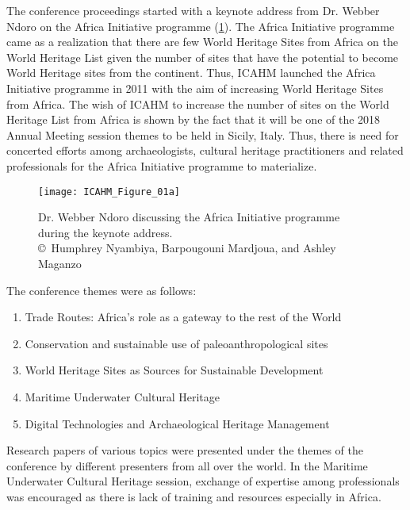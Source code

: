 The conference proceedings started with a keynote address from Dr. Webber Ndoro on the Africa Initiative programme (\cref{fig:ICAHM_Figure_01a}).  The Africa Initiative programme came as a realization that there are few World Heritage Sites from Africa on the World Heritage List given the number of sites that have the potential to become World Heritage sites from the continent. Thus, ICAHM launched the Africa Initiative programme in 2011 with the aim of increasing World Heritage Sites from Africa. The wish of ICAHM to increase the number of sites on the World Heritage List from Africa is shown by the fact that it will be one of the 2018 Annual Meeting session themes to be held in Sicily, Italy. Thus, there is need for concerted efforts among archaeologists, cultural heritage practitioners and related professionals for the Africa Initiative programme to materialize.

\begin{figure}[!htb]
	\texttt{[image: ICAHM\_Figure\_01a]}
	\caption{Dr. Webber Ndoro discussing the Africa Initiative programme during the keynote address.
		{\normalfont\scriptsize \\ \copyright\
			Humphrey Nyambiya, Barpougouni Mardjoua, and Ashley Maganzo %
	}}
	\label{fig:ICAHM_Figure_01a}
\end{figure}

The conference themes were as follows:
\begin{enumerate}
	\item Trade Routes: Africa’s role as a gateway to the rest of the World
	\item Conservation and sustainable use of paleoanthropological sites
	\item World Heritage Sites as Sources for Sustainable Development
	\item Maritime Underwater Cultural Heritage
	\item Digital Technologies and Archaeological Heritage Management
\end{enumerate}

Research papers of various topics were presented under the themes of the conference by different presenters from all over the world. In the Maritime Underwater Cultural Heritage session, exchange of expertise among professionals was encouraged as there is lack of training and resources especially in Africa.


